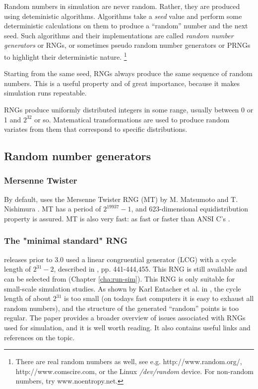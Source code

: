 Random numbers in simulation are never random. Rather, they are
produced using deteministic algorithms. Algorithms take a \textit{seed} value
and perform some deterministic calculations on them to produce
a ``random'' number and the next seed. Such algorithms and their
implementations are called \textit{random number generators} or RNGs,
or sometimes pseudo random number generators or PRNGs to highlight
their deterministic nature.
  \footnote{There are real random numbers as well, see e.g.
  http://www.random.org/, http://www.comscire.com, or the Linux
  \textit{/dev/random} device. For non-random numbers, try www.noentropy.net.}

Starting from the same seed, RNGs always produce the same sequence
of random numbers. This is a useful property and of great importance,
because it makes simulation runs repeatable.

RNGs produce uniformly distributed integers in some range,
usually between 0 or 1 and $2^{32}$ or so. Matematical transformations
are used to produce random variates from them that correspond to
specific distributions.

\subsection{Random number generators}
\label{sec:sim-lib:rngs}

\subsubsection{Mersenne Twister}

By default, {\opp} uses the Mersenne Twister RNG (MT) by M. Matsumoto and
T. Nishimura \cite{Matsumoto98}. MT has a period of $2^19937-1$,
and 623-dimensional equidistribution property is assured. MT is
also very fast: as fast or faster than ANSI C's .

\subsubsection{The "minimal standard" RNG}

{\opp} releases prior to 3.0 used a linear congruential generator
(LCG) with a cycle length of $2^{31}-2$, described in
\cite{Jain91}, pp. 441-444,455. This RNG is still available
and can be selected from  (Chapter \ref{cha:run-sim}).
This RNG is only suitable for small-scale simulation studies.
As shown by Karl Entacher et al. in \cite{Entacher02},
the cycle length of about $2^{31}$ is too small (on todays
fast computers it is easy to exhaust all random numbers), and
the structure of the generated ``random'' points is too regular.
The \cite{Hellekalek98} paper provides a broader overview of issues
associated with RNGs used for simulation, and it is well worth reading.
It also contains useful links and references on the topic.

